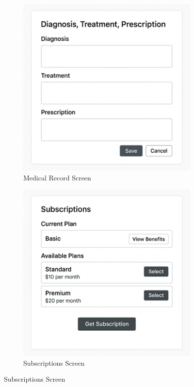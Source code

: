\documentclass[12pt,a4paper,twoside]{book}
\begin{document}
\begin{figure}[H]
    \centering
    \begin{subfigure}[b]{0.48\textwidth}
        \centering
        \includegraphics[width=\textwidth]{Mockup Screens/Diagnosis.png}
        \caption{Medical Record Screen}\label{fig:mockup9}
    \end{subfigure}
    \hfill
    \begin{subfigure}[b]{0.48\textwidth}
        \centering
        \includegraphics[width=\textwidth]{Mockup Screens/Subscription.png}
        \caption{Subscriptions Screen}\label{fig:mockup10}
    \end{subfigure}
\end{figure}
\end{document}
